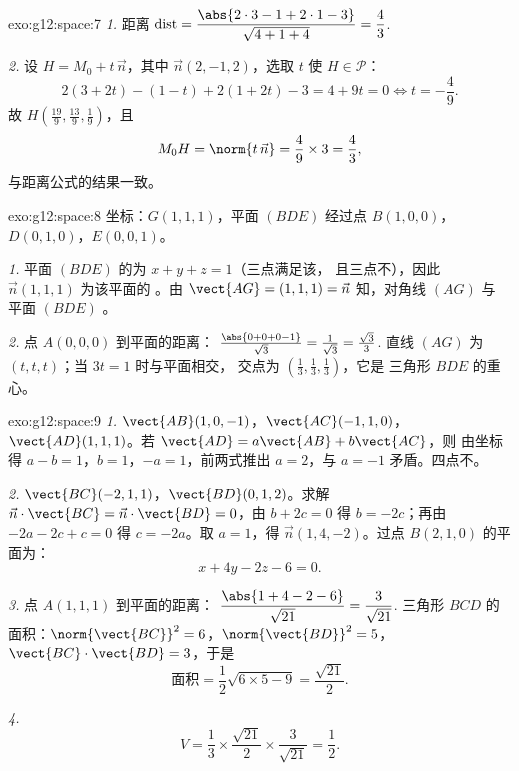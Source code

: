 \begin{solution}{exo:g12:space:7}
\emph{1.} 距离 $\operatorname{dist} = \dfrac{\abs{2\cdot3 - 1 + 2\cdot1 - 3}}
{\sqrt{4 + 1 + 4}} = \dfrac{4}{3}$.

\emph{2.} 设 $H = M_0 + t\,\vec n$，其中 $\vec n(2, -1, 2)$，选取 $t$
使 $H \in \mathcal P$：
\[
2(3 + 2t) - (1 - t) + 2(1 + 2t) - 3 = 4 + 9t = 0 \iff t = -\frac49 .
\]
故 $H\left(\frac{19}{9}, \frac{13}{9}, \frac19\right)$，且
\[
M_0H = \norm{t\,\vec n} = \frac49 \times 3 = \frac43,
\]
与距离公式的结果一致。
\end{solution}

\begin{solution}{exo:g12:space:8}
坐标：$G(1,1,1)$，平面 $(BDE)$ 经过点 $B(1,0,0)$，
$D(0,1,0)$，$E(0,0,1)$。

\emph{1.} 平面 $(BDE)$ 的为 $x + y + z = 1$（三点满足该，
且三点不），因此 $\vec n(1,1,1)$ 为该平面的
。由 $\vect{AG} = (1,1,1) = \vec n$ 知，对角线 $(AG)$ 与
平面 $(BDE)$ 。

\emph{2.} 点 $A(0,0,0)$ 到平面的距离：
$\frac{\abs{0 + 0 + 0 - 1}}{\sqrt3} = \frac{1}{\sqrt3} = \frac{\sqrt3}{3}$.
直线 $(AG)$ 为 $(t, t, t)$；当 $3t = 1$ 时与平面相交，
交点为 $\left(\frac13, \frac13, \frac13\right)$，它是
三角形 $BDE$ 的重心。
\end{solution}

\begin{solution}{exo:g12:space:9}
\emph{1.} $\vect{AB}(1, 0, -1)$，$\vect{AC}(-1, 1, 0)$，
$\vect{AD}(1, 1, 1)$。若 $\vect{AD} = a\vect{AB} + b\vect{AC}$，则
由坐标得 $a - b = 1$，$b = 1$，$-a = 1$，前两式推出
$a = 2$，与 $a = -1$ 矛盾。四点不。

\emph{2.} $\vect{BC}(-2, 1, 1)$，$\vect{BD}(0, 1, 2)$。求解
$\vec n \cdot \vect{BC} = \vec n \cdot \vect{BD} = 0$，由
$b + 2c = 0$ 得 $b = -2c$；再由 $-2a - 2c + c = 0$ 得 $c = -2a$。取
$a = 1$，得 $\vec n(1, 4, -2)$。过点 $B(2,1,0)$ 的平面为：
\[
x + 4y - 2z - 6 = 0 .
\]

\emph{3.} 点 $A(1,1,1)$ 到平面的距离：
$\dfrac{\abs{1 + 4 - 2 - 6}}{\sqrt{21}} = \dfrac{3}{\sqrt{21}}$.
三角形 $BCD$ 的面积：$\norm{\vect{BC}}^2 = 6$，$\norm{\vect{BD}}^2 = 5$，
$\vect{BC}\cdot\vect{BD} = 3$，于是
\[
\text{面积} = \frac12\sqrt{6 \times 5 - 9} = \frac{\sqrt{21}}{2}.
\]

\emph{4.}
\[
V = \frac13 \times \frac{\sqrt{21}}{2} \times \frac{3}{\sqrt{21}}
= \frac12 .
\]
\end{solution}

